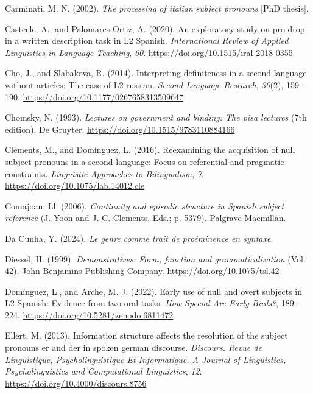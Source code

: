 \documentclass[
  letterpaper,
  DIV=11,
  numbers=noendperiod]{scrartcl}
\newlength{\cslhangindent}
\newenvironment{CSLReferences}[2] %
 {\begin{list}{}{%
  \setlength{\itemindent}{0pt}
  \setlength{\leftmargin}{0pt}
  \setlength{\parsep}{0pt}
  \ifodd #1
   \setlength{\leftmargin}{\cslhangindent}
   \setlength{\itemindent}{-1\cslhangindent}
  \fi
  \setlength{\itemsep}{#2\baselineskip}}}
 {\end{list}}
\begin{document}
\begin{CSLReferences}{1}{0}
Carminati, M. N. (2002). \emph{The processing of italian subject
pronouns} {[}PhD thesis{]}.

Casteele, A., and Palomares Ortiz, A. (2020). An exploratory study on
pro-drop in a written description task in {L2} {Spanish}.
\emph{International Review of Applied Linguistics in Language Teaching},
\emph{60}. \url{https://doi.org/10.1515/iral-2018-0355}

Cho, J., and Slabakova, R. (2014). Interpreting definiteness in a second
language without articles: The case of L2 russian. \emph{Second Language
Research}, \emph{30}(2), 159--190.
\url{https://doi.org/10.1177/0267658313509647}

Chomsky, N. (1993). \emph{Lectures on government and binding: The pisa
lectures} (7th edition). De Gruyter.
\url{https://doi.org/10.1515/9783110884166}

Clements, M., and Domínguez, L. (2016). Reexamining the acquisition of
null subject pronouns in a second language: {Focus} on referential and
pragmatic constraints. \emph{Linguistic Approaches to Bilingualism},
\emph{7}. \url{https://doi.org/10.1075/lab.14012.cle}

Comajoan, Ll. (2006). \emph{Continuity and episodic structure in Spanish
subject reference} (J. Yoon and J. C. Clements, Eds.; p. 5379). Palgrave
Macmillan.

Da Cunha, Y. (2024). \emph{Le genre comme trait de proéminence en
syntaxe}.

Diessel, H. (1999). \emph{Demonstratives: Form, function and
grammaticalization} (Vol. 42). John Benjamins Publishing Company.
\url{https://doi.org/10.1075/tsl.42}

Domínguez, L., and Arche, M. J. (2022). Early use of null and overt
subjects in {L2} {Spanish}: {Evidence} from two oral tasks. \emph{How
Special Are Early Birds?}, 189--224.
\url{https://doi.org/10.5281/zenodo.6811472}

Ellert, M. (2013). Information structure affects the resolution of the
subject pronouns er and der in spoken german discourse. \emph{Discours.
Revue de Linguistique, Psycholinguistique Et Informatique. A Journal of
Linguistics, Psycholinguistics and Computational Linguistics},
\emph{12}. \url{https://doi.org/10.4000/discours.8756}


\end{CSLReferences}
\end{document}
